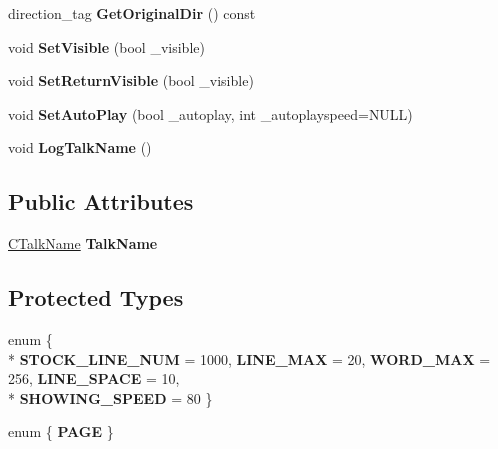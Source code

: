 \begin{DoxyCompactItemize}
\item 
direction\+\_\+tag {\bfseries Get\+Original\+Dir} () const \hypertarget{class_c_text_box_a88c6bfe580409fd230e97eef4b459886}{}\label{class_c_text_box_a88c6bfe580409fd230e97eef4b459886}

\item 
void {\bfseries Set\+Visible} (bool \+\_\+visible)\hypertarget{class_c_text_box_a01bd248991cd8095c47e348eca428113}{}\label{class_c_text_box_a01bd248991cd8095c47e348eca428113}

\item 
void {\bfseries Set\+Return\+Visible} (bool \+\_\+visible)\hypertarget{class_c_text_box_ae1080ad7b6a0104a8cf0701072b3c321}{}\label{class_c_text_box_ae1080ad7b6a0104a8cf0701072b3c321}

\item 
void {\bfseries Set\+Auto\+Play} (bool \+\_\+autoplay, int \+\_\+autoplayspeed=N\+U\+LL)\hypertarget{class_c_text_box_ac8cab32e4d3c5b4e593b2ef23a727e67}{}\label{class_c_text_box_ac8cab32e4d3c5b4e593b2ef23a727e67}

\item 
void {\bfseries Log\+Talk\+Name} ()\hypertarget{class_c_text_box_a8c93524c2dab0e76bcdcbd417a77cbbb}{}\label{class_c_text_box_a8c93524c2dab0e76bcdcbd417a77cbbb}

\end{DoxyCompactItemize}
\subsection*{Public Attributes}
\begin{DoxyCompactItemize}
\item 
\hyperlink{class_c_talk_name}{C\+Talk\+Name} {\bfseries Talk\+Name}\hypertarget{class_c_text_box_a62c9ee81affb1b131ded9511c6c0d0aa}{}\label{class_c_text_box_a62c9ee81affb1b131ded9511c6c0d0aa}

\end{DoxyCompactItemize}
\subsection*{Protected Types}
\begin{DoxyCompactItemize}
\item 
enum \{ \\*
{\bfseries S\+T\+O\+C\+K\+\_\+\+L\+I\+N\+E\+\_\+\+N\+UM} = 1000, 
{\bfseries L\+I\+N\+E\+\_\+\+M\+AX} = 20, 
{\bfseries W\+O\+R\+D\+\_\+\+M\+AX} = 256, 
{\bfseries L\+I\+N\+E\+\_\+\+S\+P\+A\+CE} = 10, 
\\*
{\bfseries S\+H\+O\+W\+I\+N\+G\+\_\+\+S\+P\+E\+ED} = 80
 \}\hypertarget{class_c_text_box_a24f328ef4e8a4ff88cd202ca1505be59}{}\label{class_c_text_box_a24f328ef4e8a4ff88cd202ca1505be59}

\item 
enum \{ {\bfseries P\+A\+GE}
 \}\hypertarget{class_c_text_box_a242b47e9de734288cdd46fb1a93d2b39}{}\label{class_c_text_box_a242b47e9de734288cdd46fb1a93d2b39}

\end{DoxyCompactItemize}
